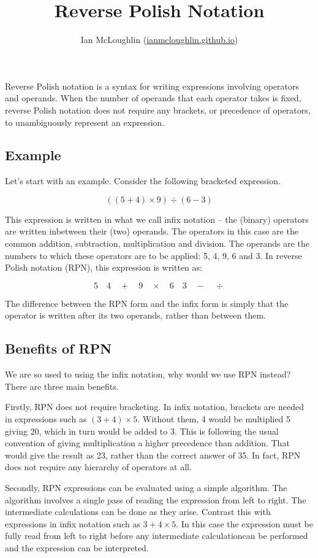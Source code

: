 \documentclass[twocolumn]{iagproc}
\title{Reverse Polish Notation}
\author{Ian McLoughlin (\href{https://ianmcloughlin.github.io}{ianmcloughlin.github.io})}
\begin{document}
\maketitle
\noindent
Reverse Polish notation is a syntax for writing expressions involving operators and operands.
When the number of operands that each operator takes is fixed, reverse Polish notation does not require any brackets, or precedence of operators, to unambiguously represent an expression.

\subsection*{Example}
Let’s start with an example.
Consider the following bracketed expression.

$$ ((5 + 4) \times 9) \div (6 - 3) $$

This expression is written in what we call infix notation -- the (binary) operators are written inbetween their (two) operands.
The operators in this case are the common addition, subtraction, multiplication and division.
The operands are the numbers to which these operators are to be applied: 5, 4, 9, 6 and 3.
In reverse Polish notation (RPN), this expression is written as:

$$ 5 \quad 4 \quad + \quad 9 \quad \times \quad  6 \quad 3 \quad - \quad \div $$

The difference between the RPN form and the infix form is simply that the operator is written after its two operands, rather than between them.

\subsection*{Benefits of RPN}
We are so used to using the infix notation, why would we use RPN instead?
There are three main benefits.

Firstly, RPN does not require bracketing.
In infix notation, brackets are needed in expressions such as $(3 + 4) \times 5$.
Without them, 4 would be multiplied 5 giving 20, which in turn would be added to 3.
This is following the usual convention of giving multiplication a higher precedence than addition.
That would give the result as 23, rather than the correct answer of 35.
In fact, RPN does not require any hierarchy of operators at all.

Secondly, RPN expressions can be evaluated using a simple algorithm.
The algorithm involves a single pass of reading the expression from left to right.
The intermediate calculations can be done as they arise.
Contrast this with expressions in infix notation such as $3 + 4 \times 5$.
In this case the expression must be fully read from left to right before any intermediate calculationcan be performed and the expression can be interpreted.
\end{document}

